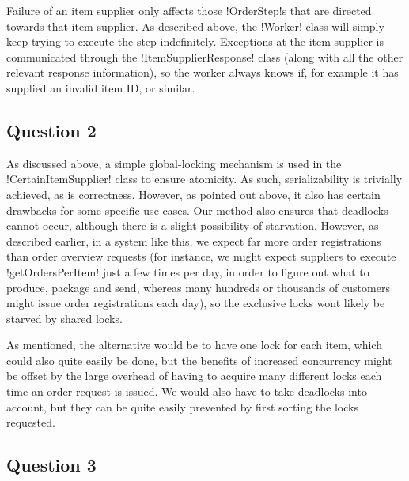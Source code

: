 \documentclass[a4paper, 12pt]{article}
\begin{document}
Failure of an item supplier only affects those !OrderStep!s that are
directed towards that item supplier. As described above, the !Worker!
class will simply keep trying to execute the step
indefinitely. Exceptions at the item supplier is communicated through
the !ItemSupplierResponse! class (along with all the other relevant
response information), so the worker always knows if, for example it
has supplied an invalid item ID, or similar.

\subsection*{Question 2}





As discussed above, a simple global-locking mechanism is used in the
!CertainItemSupplier! class to ensure atomicity. As such,
serializability is trivially achieved, as is correctness. However, as
pointed out above, it also has certain drawbacks for some specific use
cases. Our method also ensures that deadlocks cannot occur, although
there is a slight possibility of starvation. However, as described
earlier, in a system like this, we expect far more order registrations
than order overview requests (for instance, we might expect suppliers
to execute !getOrdersPerItem! just a few times per day, in order to
figure out what to produce, package and send, whereas many hundreds or
thousands of customers might issue order registrations each day), so
the exclusive locks wont likely be starved by shared locks.

As mentioned, the alternative would be to have one lock for each item,
which could also quite easily be done, but the benefits of increased
concurrency might be offset by the large overhead of having to acquire
many different locks each time an order request is
issued. We would also have to take deadlocks into account, but they
can be quite easily prevented by first sorting the locks requested.

\subsection*{Question 3}
\end{document}
